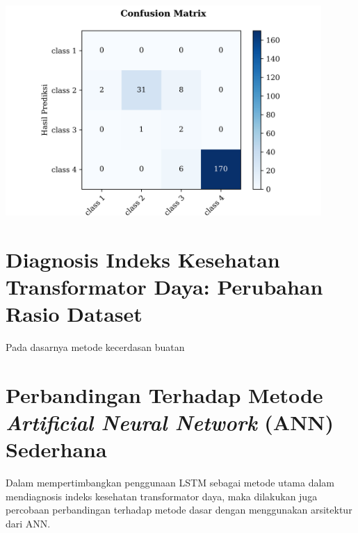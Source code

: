 \begin{minipage}{\linewidth}
	\begin{center}
		\includegraphics[width=0.9\textwidth]{BAB-4/plot/CM_selu_data_besar.png}	
	\end{center}
\end{minipage}
\section{Diagnosis Indeks Kesehatan Transformator Daya: Perubahan Rasio Dataset}
Pada dasarnya metode kecerdasan buatan 

\section{Perbandingan Terhadap Metode \textit{Artificial Neural Network} (ANN) Sederhana}
Dalam mempertimbangkan penggunaan LSTM sebagai metode utama dalam mendiagnosis indeks kesehatan transformator daya, maka dilakukan juga percobaan perbandingan terhadap metode dasar dengan menggunakan arsitektur dari ANN. 


%	

%	

